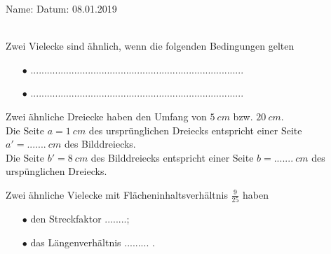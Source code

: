 \documentclass[12 pt]{exam}
\begin{document}
 
 
\noindent Name: \hrulefill \qquad \qquad \qquad \qquad \qquad \qquad Datum: 08.01.2019\\ \\ 
\begin{center} 
\vspace{0.75cm}
\addpoints 
\gradetable[h][questions] 
\end{center} 
\vspace{0.75cm} 
\begin{questions} 
	
\question[2] Zwei Vielecke sind \"ahnlich, wenn die folgenden Bedingungen gelten
\begin{itemize}
	\item[$\bullet$] ..............................................................................
	\item[$\bullet$] ..............................................................................
\end{itemize}
 
\question[2] Zwei \"ahnliche Dreiecke haben den Umfang von $5\ cm$ bzw. $20\ cm$. \\
Die Seite $a = 1\ cm$ des urspr\"unglichen Dreiecks entspricht einer Seite  $a' = ....... \ cm$ des Bilddreiecks.\\
Die Seite $b' = 8\ cm$ des Bilddreiecks entspricht einer Seite $b =....... \ cm$ des ursp\"unglichen Dreiecks.

\question[1] Zwei \"ahnliche Vielecke mit Fl\"acheninhaltsverh\"altnis $\frac{9}{25}$ haben 
\begin{itemize}
	\item[$\bullet$] den Streckfaktor ........;
	\item[$\bullet$] das L\"angenverh\"altnis ......... . 
\end{itemize}
\end{questions}
\end{document}
